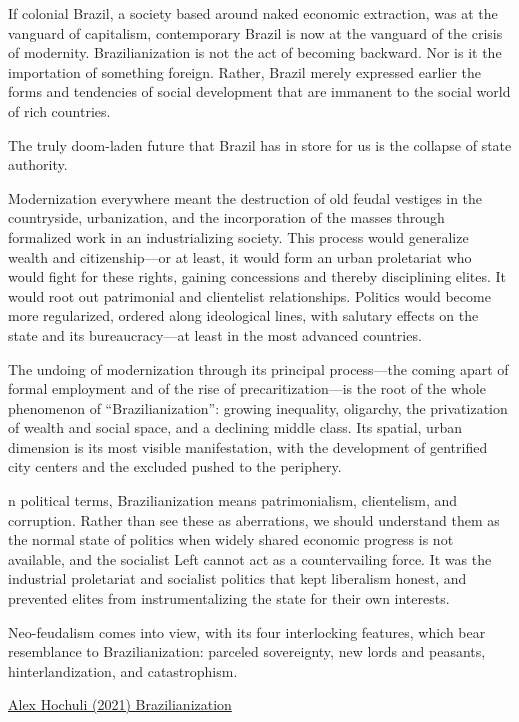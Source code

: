 \documentclass[
]{book}
\begin{document}
If colonial Brazil, a society based around naked economic extrac­tion, was at the vanguard of capitalism, contemporary Brazil is now at the vanguard of the crisis of modernity. Brazilianization is not the act of becoming backward. Nor is it the importation of something for­eign. Rather, Brazil merely expressed earlier the forms and tendencies of social development that are immanent to the social world of rich countries.

The truly doom-laden future that Brazil has in store for us is the collapse of state authority.

Modernization everywhere meant the destruction of old feudal ves­tiges in the countryside, urbanization, and the incorporation of the masses through formalized work in an industrializing society. This process would generalize wealth and citizenship---or at least, it would form an urban proletariat who would fight for these rights, gaining concessions and thereby disciplining elites. It would root out patri­monial and clientelist relationships. Politics would become more regularized, ordered along ideological lines, with salutary effects on the state and its bureaucracy---at least in the most advanced countries.

The undoing of modernization through its principal process---the coming apart of formal employment and of the rise of precaritization---is the root of the whole phenomenon of ``Brazilianization'': growing inequality, oligarchy, the privatization of wealth and social space, and a declining middle class. Its spatial, urban dimension is its most visible manifestation, with the development of gentrified city centers and the excluded pushed to the periphery.

n political terms, Brazilianization means patrimonialism, clientelism, and corruption. Rather than see these as aberrations, we should understand them as the normal state of politics when widely shared economic progress is not available, and the socialist Left can­not act as a countervailing force. It was the industrial proletariat and socialist politics that kept liberalism honest, and prevented elites from instrumentalizing the state for their own interests.

Neo-feudalism comes into view, with its four interlocking features, which bear resemblance to Brazilianization: parceled sovereignty, new lords and peasants, hinterlandization, and catastrophism.

\href{https://americanaffairsjournal.org/2021/05/the-brazilianization-of-the-world/}{Alex Hochuli (2021) Brazilianization}
\end{document}
